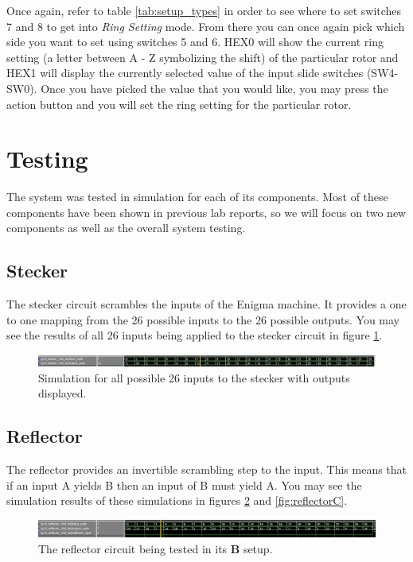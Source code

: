 \documentclass{article}
\begin{document}
Once again, refer to table \ref{tab:setup_types} in order to see where to set switches 7 and 8 to get into \textit{Ring Setting} mode. From there you can once again pick which side you want to set using switches 5 and 6. HEX0 will show the current ring setting (a letter between A - Z symbolizing the shift) of the particular rotor and HEX1 will display the currently selected value of the input slide switches (SW4-SW0). Once you have picked the value that you would like, you may press the action button and you will set the ring setting for the particular rotor.


\section{Testing}
The system was tested in simulation for each of its components. Most of these components have been shown in previous lab reports, so we will focus on two new components as well as the overall system testing. 
\subsection{Stecker}
The stecker circuit scrambles the inputs of the Enigma machine. It provides a one to one mapping from the 26 possible inputs to the 26 possible outputs. You may see the results of all 26 inputs being applied to the stecker circuit in figure \ref{fig:stecker_sim}. 


\begin{figure}[ht!]
    \centering
    \includegraphics[scale=0.35]{stecker_sim.PNG}
    \caption{Simulation for all possible 26 inputs to the stecker with outputs displayed. }
    \label{fig:stecker_sim}
\end{figure}


\subsection{Reflector}
The reflector provides an invertible scrambling step to the input. This means that if an input A yields B then an input of B must yield A. You may see the simulation results of these simulations in figures \ref{fig:reflectorB} and \ref{fig:reflectorC}.


\begin{figure}[ht!]
    \centering
    \includegraphics[scale=0.35]{reflectorB.PNG}
    \caption{The reflector circuit being tested in its \textbf{B} setup.}
    \label{fig:reflectorB}
\end{figure}
\end{document}
